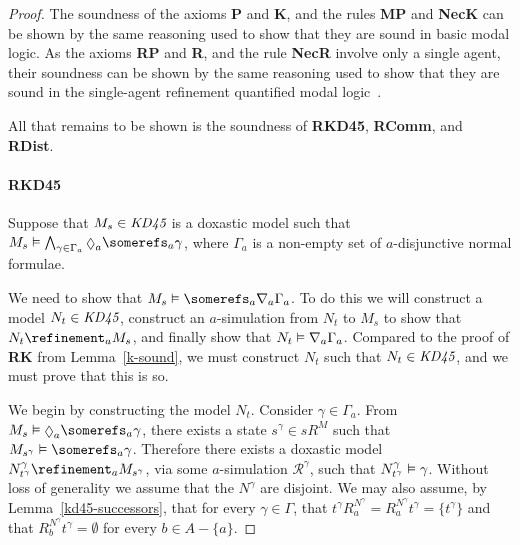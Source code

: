 \begin{proof}
The soundness of the axioms {\bf P} and {\bf K}, and the rules {\bf MP} and
{\bf NecK} can be shown by the same reasoning used to show that they are sound
in basic modal logic. As the axioms {\bf RP} and {\bf R}, and the rule {\bf
NecR} involve only a single agent, their soundness can be shown by the same
reasoning used to show that they are sound in the single-agent refinement
quantified modal logic~\cite{french2010future}.

All that remains to be shown is the soundness of {\bf RKD45}, {\bf RComm}, and
{\bf RDist}.

\paragraph{RKD45}
Suppose that $M_s \in \textit{KD45}$ is a doxastic model such that $M_s \entails
\bigwedge_{\gamma \in \Gamma_a} \suspects_a \somerefs_a \gamma$, where $\Gamma_a$ is
a non-empty set of $a$-disjunctive normal formulae.

We need to show that $M_s \entails \somerefs_a \covers_a \Gamma_a$. To do this
we will construct a model $N_t \in \textit{KD45}$, construct an $a$-simulation from
$N_t$ to $M_s$ to show that $N_t \refinement_a M_s$, and finally show that $N_t
\vDash \nabla_a \Gamma_a$. Compared to the proof of {\bf RK} from
Lemma~\ref{k-sound}, we must construct $N_t$ such that $N_t \in \textit{KD45}$, and
we must prove that this is so.

We begin by constructing the model $N_t$. Consider $\gamma \in \Gamma_a$. From
$M_s \entails \suspects_a \somerefs_a \gamma$, there exists a state $s^\gamma
\in sR^M$ such that $M_{s^\gamma} \entails \somerefs_a \gamma$. Therefore there
exists a doxastic model $N^\gamma_{t^\gamma} \refinement_a M_{s^\gamma}$, via
some $a$-simulation $\mathcal{R}^\gamma$, such that $N^\gamma_{t^\gamma}
\vDash \gamma$. Without loss of generality we assume that the $N^\gamma$ are
disjoint. We may also assume, by Lemma~\ref{kd45-successors}, that for every
$\gamma \in \Gamma$, that $t^\gamma R^{N^\gamma}_a = R^{N^\gamma}_a t^\gamma =
\{t^\gamma\}$ and that $R^{N^\gamma}_b t^\gamma = \emptyset$ for every $b \in A
- \{a\}$.


\end{proof}

